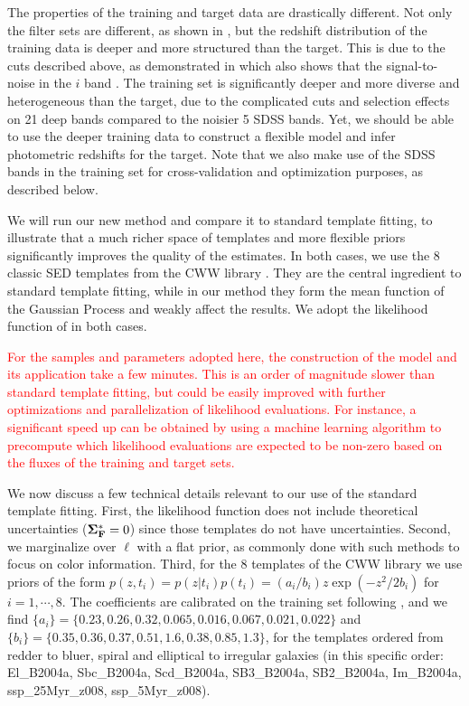 \documentclass[aps,prd,showpacs,superscriptaddress,groupedaddress]{revtex4}  %
\newcommand{\bl}[1]{\textcolor{red}{#1}}
\begin{document}
The properties of the training and target data are drastically different.
Not only the filter sets are different, as shown in , but the redshift distribution of the training data is deeper and more structured than the target.
This is due to the cuts described above, as demonstrated in  which also shows that the signal-to-noise in the $i$ band .
The training set is significantly deeper and more diverse and heterogeneous than the target, due to the complicated cuts and selection effects on 21 deep bands compared to the noisier 5 SDSS bands.
Yet, we should be able to use the deeper training data to construct a flexible model and infer photometric redshifts for the target.
Note that we also make use of the SDSS bands in the training set for cross-validation and optimization purposes, as described below.

We will run our new method and compare it to standard template fitting, to illustrate that a much richer space of templates and more flexible priors significantly improves the quality of the \photoz estimates.
In both cases, we use the 8 classic SED templates from the CWW library \citep{Coleman:1980ej, Benitez:1998br}. 
They are the central ingredient to standard template fitting, while in our method they form the mean function of the Gaussian Process and weakly affect the results. 
We adopt the likelihood function of  in both cases.

\bl{For the samples and parameters adopted here, the construction of the model and its application take a few minutes. 
This is an order of magnitude slower than standard template fitting, but could be easily improved with further optimizations and parallelization of likelihood evaluations.
For instance, a significant speed up can be obtained by using a machine learning algorithm to precompute which likelihood evaluations are expected to be non-zero based on the fluxes of the training and target sets.}

We now discuss a few technical details relevant to our use of the standard template fitting.
First, the likelihood function does not include theoretical uncertainties ($\mat{\Sigma}^*_\mat{F}=0$) since those templates do not have uncertainties. 
Second, we marginalize over $\ell$ with a flat prior, as commonly done with such \photoz methods to focus on color information.
Third, for the 8 templates of the CWW library we use priors of the form $p(z,t_i)= p(z|t_i)p(t_i) = ({a_i}/{b_i} ) z \exp(-{z^2}/{2 b_i} ) $ for $i=1, \cdots, 8$. 
The coefficients are calibrated on the training set following \citep{Coleman:1980ej, Benitez:1998br}, and we find
$\{a_i\} = \{ 0.23, 0.26, 0.32, 0.065, 0.016, 0.067, 0.021, 0.022 \}$ and $\{b_i\} = \{ 0.35, 0.36, 0.37, 0.51, 1.6, 0.38, 0.85, 1.3\}$, for the templates ordered from redder to bluer, \ie spiral and elliptical to irregular galaxies (in this specific order: El\_B2004a, Sbc\_B2004a, Scd\_B2004a, SB3\_B2004a, SB2\_B2004a, Im\_B2004a, ssp\_25Myr\_z008, ssp\_5Myr\_z008).
\end{document}

